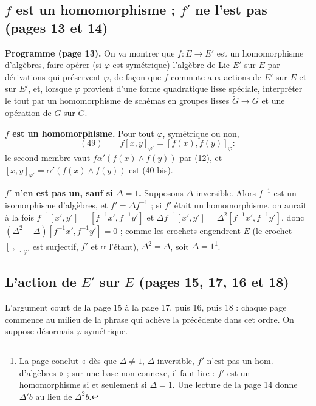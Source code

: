 \documentclass[11pt,a4paper]{article}
\begin{document}
\subsection*{$f$ est un homomorphisme ; $f'$ ne l'est pas (pages 13 et 14)}

\textbf{Programme (page 13).} On va montrer que $f : E \to E'$ est un
homomorphisme d'algèbres, faire opérer (si $\varphi$ est symétrique) l'algèbre de
Lie $E'$ sur $E$ par dérivations qui préservent $\varphi$, de façon que $f$ commute
aux actions de $E'$ sur $E$ et sur $E'$, et, lorsque $\varphi$ provient d'une forme
quadratique lisse spéciale, interpréter le tout par un homomorphisme de schémas
en groupes lisses $\widetilde{G} \to G$ et une opération de $G$ sur $\widetilde{G}$.

\textbf{$f$ est un homomorphisme.} Pour tout $\varphi$, symétrique ou non,
\[
  (49) \qquad f[x, y]_{\varphi'} = [f(x), f(y)]_{\varphi} :
\]
le second membre vaut $f\alpha'(f(x) \wedge f(y))$ par (12), et
$[x, y]_{\varphi'} = \alpha'(f(x) \wedge f(y))$ est (40 bis).

\textbf{$f'$ n'en est pas un, sauf si $\Delta = 1$.} Supposons $\Delta$ inversible.
Alors $f^{-1}$ est un isomorphisme d'algèbres, et $f' = \Delta f^{-1}$ ; si $f'$
était un homomorphisme, on aurait à la fois
$f^{-1}[x', y'] = [f^{-1}x', f^{-1}y']$ et
$\Delta f^{-1}[x', y'] = \Delta^2 [f^{-1}x', f^{-1}y']$, donc
$(\Delta^2 - \Delta)[f^{-1}x', f^{-1}y'] = 0$ ; comme les crochets engendrent $E$
(le crochet $[\ ,\ ]_{\varphi'}$ est surjectif, $f'$ et $\alpha$ l'étant), $\Delta^2 = \Delta$,
soit $\Delta = 1$\footnote{La page conclut « dès que $\Delta \neq 1$, $\Delta$
inversible, $f'$ n'est pas un hom. d'algèbres » ; sur une base non connexe, il
faut lire : $f'$ est un homomorphisme si et seulement si $\Delta = 1$. Une
lecture de la page 14 donne $\Delta' b$ au lieu de $\Delta^2 b$.}.

\subsection*{L'action de $E'$ sur $E$ (pages 15, 17, 16 et 18)}

L'argument court de la page 15 à la page 17, puis 16, puis 18 : chaque page
commence au milieu de la phrase qui achève la précédente dans cet ordre. On
suppose désormais $\varphi$ symétrique.
\end{document}
